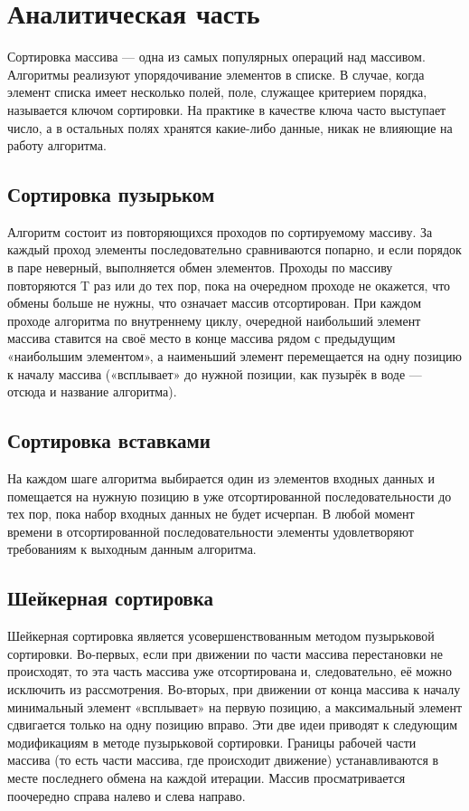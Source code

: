 \documentclass[12pt]{report}
\begin{document}
\chapter{Аналитическая часть}
Сортировка массива — одна из самых популярных операций над массивом. Алгоритмы реализуют упорядочивание элементов в списке. В случае, когда элемент списка имеет несколько полей, поле, служащее критерием порядка, называется ключом сортировки. На практике в качестве ключа часто выступает число, а в остальных полях хранятся какие-либо данные, никак не влияющие на работу алгоритма. 
	    
\section{Сортировка пузырьком}
Алгоритм состоит из повторяющихся проходов по сортируемому массиву. За каждый проход элементы последовательно сравниваются попарно, и если порядок в паре неверный, выполняется обмен элементов. Проходы по массиву повторяются T раз или до тех пор, пока на очередном проходе не окажется, что обмены больше не нужны, что означает массив отсортирован. При каждом проходе алгоритма по внутреннему циклу, очередной наибольший элемент массива ставится на своё место в конце массива рядом с предыдущим «наибольшим элементом», а наименьший элемент перемещается на одну позицию к началу массива («всплывает» до нужной позиции, как пузырёк в воде — отсюда и название алгоритма).



\section{Сортировка вставками}
На каждом шаге алгоритма выбирается один из элементов входных данных и помещается на нужную позицию в уже отсортированной последовательности до тех пор, пока набор входных данных не будет исчерпан. В любой момент времени в отсортированной последовательности элементы удовлетворяют требованиям к выходным данным алгоритма. 


\section{Шейкерная сортировка}
Шейкерная сортировка является усовершенствованным методом пузырьковой сортировки. Во-первых, если при движении по части массива перестановки не происходят, то эта часть массива уже отсортирована и, следовательно, её можно исключить из рассмотрения.
Во-вторых, при движении от конца массива к началу минимальный элемент «всплывает» на первую позицию, а максимальный элемент сдвигается только на одну позицию вправо.
Эти две идеи приводят к следующим модификациям в методе пузырьковой сортировки. Границы рабочей части массива (то есть части массива, где происходит движение) устанавливаются в месте последнего обмена на каждой итерации. Массив просматривается поочередно справа налево и слева направо.
\end{document}
